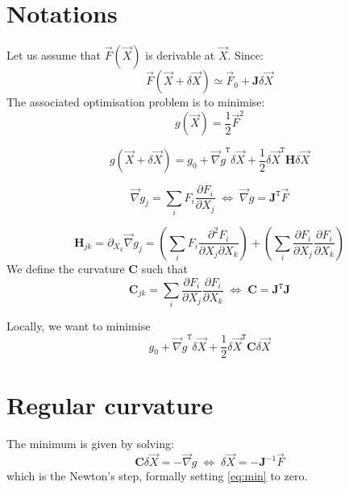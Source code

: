 \documentclass[aps,12pt]{revtex4}
\newcommand{\trn}[1]{{#1}^{\mathtt{T}}}
\begin{document}
\section{Notations}

Let us assume that $\vec{F}(\vec{X})$ is derivable at $\vec{X}$.
Since:
\begin{equation}
	\vec{F}(\vec{X}+\delta\vec{X}) \simeq \vec{F}_0 + \bm{J} \delta\vec{X}
\end{equation}
The associated optimisation problem is to minimise:
\begin{equation}
	g(\vec{X}) = \dfrac{1}{2} \vec{F}^2
\end{equation}

\begin{equation}
	g(\vec{X}+\delta\vec{X}) = g_0 + \trn{\vec{\nabla}g} \delta\vec{X} + \dfrac{1}{2} \trn{\delta\vec{X}} \bm{H} \delta\vec{X}
\end{equation}

\begin{equation}
	\vec{\nabla}g_j = \sum_i F_i \dfrac{\partial F_i}{\partial X_j} \; \Leftrightarrow \; \vec{\nabla}g = \trn{\bm{J}} \vec{F}
\end{equation}

\begin{equation}
	\bm{H}_{jk} = \partial_{X_k} \vec{\nabla}g_j 
	= 
	\left( \sum_i F_i \dfrac{\partial^2 F_i}{\partial X_j \partial X_k} \right)
	+ \left( \sum_i \dfrac{\partial F_i}{\partial X_j} \dfrac{\partial F_i}{\partial X_k}\right)
\end{equation}
We define the curvature $\bm{C}$ such that
\begin{equation}
		\bm{C}_{jk} =   \sum_i \dfrac{\partial F_i}{\partial X_j} \dfrac{\partial F_i}{\partial X_k} \; \Leftrightarrow \;
		\bm{C} = \trn{\bm{J}}\bm{J}
\end{equation}

Locally, we want to minimise
\begin{equation}
	\label{eq:min}
	g_0 +  \trn{\vec{\nabla}g} \delta\vec{X} + \dfrac{1}{2} \trn{\delta\vec{X}} \bm{C} \delta\vec{X}
\end{equation}



\section{Regular curvature}
The minimum is given by solving:
\begin{equation}
\bm{C} \delta\vec{X} = -\vec{\nabla}g  \; \Leftrightarrow \;  \delta\vec{X} = - \bm{J}^{-1} \vec{F}
\end{equation}
which is the Newton's step, formally setting \eqref{eq:min} to zero.
\end{document}
